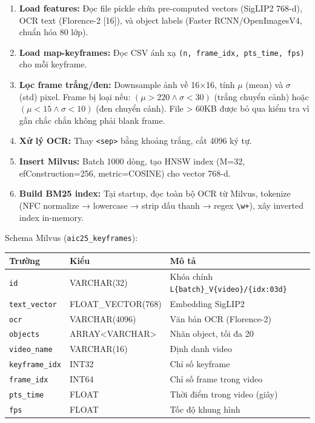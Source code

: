 \documentclass[12pt,a4paper,onecolumn]{article}
\begin{document}
\begin{enumerate}
  \item \textbf{Load features:} Đọc file pickle chứa pre-computed vectors (SigLIP2 768-d), OCR text (Florence-2 [16]), và object labels (Faster RCNN/OpenImagesV4, chuẩn hóa 80 lớp).
  \item \textbf{Load map-keyframes:} Đọc CSV ánh xạ \texttt{(n, frame\_idx, pts\_time, fps)} cho mỗi keyframe.
  \item \textbf{Lọc frame trắng/đen:} Downsample ảnh về 16×16, tính $\mu$ (mean) và $\sigma$ (std) pixel. Frame bị loại nếu: $(\mu > 220 \wedge \sigma < 30)$ (trắng chuyển cảnh) hoặc $(\mu < 15 \wedge \sigma < 10)$ (đen chuyển cảnh). File > 60KB được bỏ qua kiểm tra vì gần chắc chắn không phải blank frame.
  \item \textbf{Xử lý OCR:} Thay \texttt{<sep>} bằng khoảng trắng, cắt 4096 ký tự.
  \item \textbf{Insert Milvus:} Batch 1000 dòng, tạo HNSW index (M=32, efConstruction=256, metric=COSINE) cho vector 768-d.
  \item \textbf{Build BM25 index:} Tại startup, đọc toàn bộ OCR từ Milvus, tokenize (NFC normalize → lowercase → strip dấu thanh → regex \texttt{\textbackslash{}w+}), xây inverted index in-memory.
\end{enumerate}


Schema Milvus (\texttt{aic25\_keyframes}):

\begin{center}
\begin{tabular}{l l l}
\toprule
Trường & Kiểu & Mô tả \\
\midrule
\texttt{id} & VARCHAR(32) & Khóa chính \texttt{L\{batch\}\_V\{video\}/\{idx:03d\}} \\
\texttt{text\_vector} & FLOAT\_VECTOR(768) & Embedding SigLIP2 \\
\texttt{ocr} & VARCHAR(4096) & Văn bản OCR (Florence-2) \\
\texttt{objects} & ARRAY<VARCHAR> & Nhãn object, tối đa 20 \\
\texttt{video\_name} & VARCHAR(16) & Định danh video \\
\texttt{keyframe\_idx} & INT32 & Chỉ số keyframe \\
\texttt{frame\_idx} & INT64 & Chỉ số frame trong video \\
\texttt{pts\_time} & FLOAT & Thời điểm trong video (giây) \\
\texttt{fps} & FLOAT & Tốc độ khung hình \\
\bottomrule
\end{tabular}
\end{center}
\end{document}
